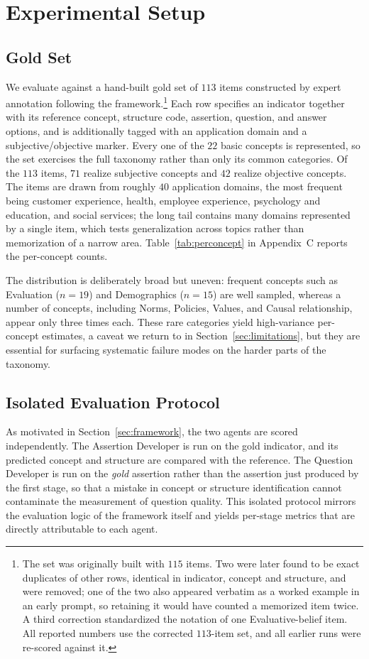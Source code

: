 \documentclass[onecolumn, 11pt]{IEEEtran}
\begin{document}
\section{Experimental Setup}
\label{sec:setup}

\subsection{Gold Set}
We evaluate against a hand-built gold set of $113$ items constructed by expert annotation following the framework.\footnote{The set was originally built with $115$ items. Two were later found to be exact duplicates of other rows, identical in indicator, concept and structure, and were removed; one of the two also appeared verbatim as a worked example in an early prompt, so retaining it would have counted a memorized item twice. A third correction standardized the notation of one Evaluative-belief item. All reported numbers use the corrected $113$-item set, and all earlier runs were re-scored against it.} Each row specifies an indicator together with its reference concept, structure code, assertion, question, and answer options, and is additionally tagged with an application domain and a subjective/objective marker. Every one of the $22$ basic concepts is represented, so the set exercises the full taxonomy rather than only its common categories. Of the $113$ items, $71$ realize subjective concepts and $42$ realize objective concepts. The items are drawn from roughly $40$ application domains, the most frequent being customer experience, health, employee experience, psychology and education, and social services; the long tail contains many domains represented by a single item, which tests generalization across topics rather than memorization of a narrow area. Table~\ref{tab:perconcept} in Appendix~C reports the per-concept counts.

The distribution is deliberately broad but uneven: frequent concepts such as Evaluation ($n{=}19$) and Demographics ($n{=}15$) are well sampled, whereas a number of concepts, including Norms, Policies, Values, and Causal relationship, appear only three times each. These rare categories yield high-variance per-concept estimates, a caveat we return to in Section~\ref{sec:limitations}, but they are essential for surfacing systematic failure modes on the harder parts of the taxonomy.


\subsection{Isolated Evaluation Protocol}
As motivated in Section~\ref{sec:framework}, the two agents are scored independently. The Assertion Developer is run on the gold indicator, and its predicted concept and structure are compared with the reference. The Question Developer is run on the \emph{gold} assertion rather than the assertion just produced by the first stage, so that a mistake in concept or structure identification cannot contaminate the measurement of question quality. This isolated protocol mirrors the evaluation logic of the framework itself and yields per-stage metrics that are directly attributable to each agent.
\end{document}
